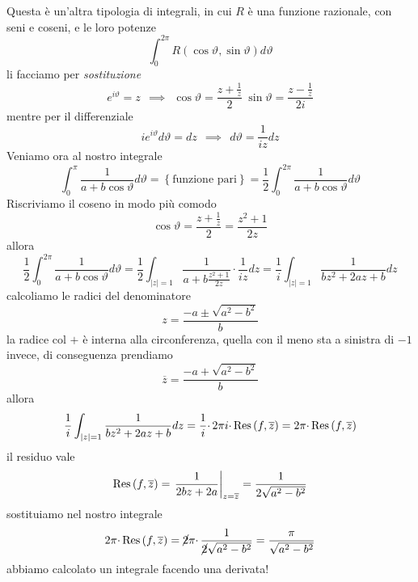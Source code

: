 Questa è un'altra tipologia di integrali, in cui $R$ è una funzione razionale, con seni e coseni, e le loro potenze
\begin{equation*}
\int ^{2\pi }_{0} R\left(\cos \vartheta ,\sin \vartheta \right) d\vartheta 
\end{equation*}
li facciamo per \textit{sostituzione}
\begin{equation*}
\boxed{e^{i\vartheta } =z} \ \ \implies \ \ \boxed{\cos \vartheta =\frac{z+\frac{1}{z}}{2}} \ \boxed{\sin \vartheta =\frac{z-\frac{1}{z}}{2i}}
\end{equation*}
mentre per il differenziale
\begin{equation*}
ie^{i\vartheta } d\vartheta =dz\ \ \implies \ \ \boxed{d\vartheta =\frac{1}{iz} dz}
\end{equation*}
Veniamo ora al nostro integrale
\begin{equation*}
\int ^{\pi }_{0}\frac{1}{a+b\cos \vartheta } d\vartheta =\left\{\text{funzione pari}\right\} =\frac{1}{2}\int ^{2\pi }_{0}\frac{1}{a+b\cos \vartheta } d\vartheta 
\end{equation*}
Riscriviamo il coseno in modo più comodo
\begin{equation*}
\cos \vartheta =\frac{z+\frac{1}{z}}{2} =\frac{z^{2} +1}{2z}
\end{equation*}
allora
\begin{equation*}
\frac{1}{2}\int ^{2\pi }_{0}\frac{1}{a+b\cos \vartheta } d\vartheta =\frac{1}{2}\int _{\left| z\right| =1}\frac{1}{a+b\frac{z^{2} +1}{2z}} \cdotp \frac{1}{iz} dz=\frac{1}{i}\int _{\left| z\right| =1}\frac{1}{bz^{2} +2az+b} dz
\end{equation*}
calcoliamo le radici del denominatore
\begin{equation*}
z=\frac{-a\pm \sqrt{a^{2} -b^{2}}}{b}
\end{equation*}
la radice col $+$ è interna alla circonferenza, quella con il meno sta a sinistra di $-1$ invece, di conseguenza prendiamo
\begin{equation*}
\overline{z} =\frac{-a+\sqrt{a^{2} -b^{2}}}{b}
\end{equation*}
allora
\begin{equation*}
\frac{1}{i}\int _{\left| z\right| =1}\frac{1}{bz^{2} +2az+b} dz=\frac{1}{i} \cdotp 2\pi i\cdotp \operatorname{Res} \left( f,\overline{z}\right) =2\pi \cdotp \operatorname{Res} \left( f,\overline{z}\right)
\end{equation*}
il residuo vale
\begin{equation*}
\operatorname{Res} \left( f,\overline{z}\right) =\left. \frac{1}{2bz+2a}\right| _{z=\overline{z}} =\frac{1}{2\sqrt{a^{2} -b^{2}}}
\end{equation*}
sostituiamo nel nostro integrale
\begin{equation*}
2\pi \cdotp \operatorname{Res} \left( f,\overline{z}\right) =\cancel{2} \pi \cdotp \frac{1}{\cancel{2}\sqrt{a^{2} -b^{2}}} =\frac{\pi }{\sqrt{a^{2} -b^{2}}}
\end{equation*}
abbiamo calcolato un integrale facendo una derivata!
\Soluzione

